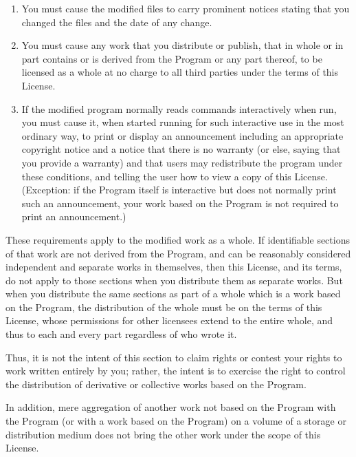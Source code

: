 \documentclass[a4paper,11pt,oneside]{book}
\begin{document}
\begin{enumerate}
	\begin{enumerate}

		\item

		You must cause the modified files to carry prominent notices stating that
		you changed the files and the date of any change.

		\item

		You must cause any work that you distribute or publish, that in
		whole or in part contains or is derived from the Program or any
		part thereof, to be licensed as a whole at no charge to all third
		parties under the terms of this License.

		\item
		If the modified program normally reads commands interactively
		when run, you must cause it, when started running for such
		interactive use in the most ordinary way, to print or display an
		announcement including an appropriate copyright notice and a
		notice that there is no warranty (or else, saying that you provide
		a warranty) and that users may redistribute the program under
		these conditions, and telling the user how to view a copy of this
		License.  (Exception: if the Program itself is interactive but
		does not normally print such an announcement, your work based on
		the Program is not required to print an announcement.)

	\end{enumerate}


	These requirements apply to the modified work as a whole.  If
	identifiable sections of that work are not derived from the Program,
	and can be reasonably considered independent and separate works in
	themselves, then this License, and its terms, do not apply to those
	sections when you distribute them as separate works.  But when you
	distribute the same sections as part of a whole which is a work based
	on the Program, the distribution of the whole must be on the terms of
	this License, whose permissions for other licensees extend to the
	entire whole, and thus to each and every part regardless of who wrote it.

	Thus, it is not the intent of this section to claim rights or contest
	your rights to work written entirely by you; rather, the intent is to
	exercise the right to control the distribution of derivative or
	collective works based on the Program.

	In addition, mere aggregation of another work not based on the Program
	with the Program (or with a work based on the Program) on a volume of
	a storage or distribution medium does not bring the other work under
	the scope of this License.


\end{enumerate}
\end{document}
